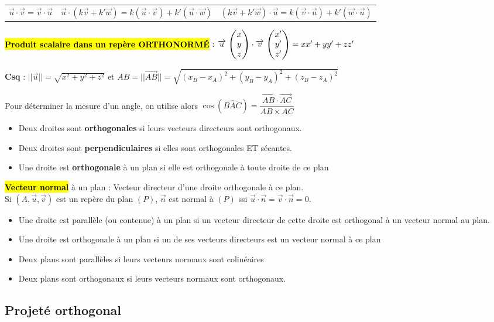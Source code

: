 \documentclass[10pt,fleqn, openany, landscape, twocolumn]{book} %
\begin{document}
\begin{tabularx}{\linewidth}{cXX}
$\vec u \cdot \vec v = \vec v \cdot \vec u$ & $\vec u \cdot ( k \vec v + k' \vec w)= k (\vec u \cdot \vec v) + k' (\vec u \cdot \vec w)$ & $( k \vec v + k' \vec w)\cdot \vec u= k (\vec v \cdot \vec u) + k' (\vec w \cdot \vec u)$\end{tabularx}

\hl{\textbf{Produit scalaire dans un repère ORTHONORMÉ}} :  $\renewcommand{\arraystretch}{1}\coorde{u}{x}{y}{z} \cdot \coorde{v}{x'}{y'}{z'} =xx'+yy'+zz'$

\textbf{Csq} : $||\vec u|| = \sqrt{x^2+y^2+z^2}$ et $AB = ||\overrightarrow{AB}||= \sqrt{(x_B-x_A)^2+(y_B-y_A)^2+(z_B-z_A)^2}$

Pour déterminer la mesure d'un angle, on utilise alors $\cos(\widehat{BAC})=\dfrac{\overrightarrow{AB} \cdot \overrightarrow{AC}}{AB \times AC}$

\begin{itemize}
\item Deux droites sont \textbf{orthogonales} si leurs vecteurs directeurs sont orthogonaux.
\item Deux droites sont \textbf{perpendiculaires} si elles sont orthogonales ET sécantes.
\item Une droite est \textbf{orthogonale} à un plan si elle est orthogonale à toute droite de ce plan
\end{itemize}

\hl{\textbf{Vecteur normal}} à un plan : Vecteur directeur d'une droite orthogonale à ce plan.\\
Si $(A, \vec u, \vec v)$ est un repère du plan $(P)$, $\vec n$ est normal à $(P)$ ssi $\vec u \cdot \vec n = \vec v \cdot \vec n = 0$.

\begin{itemize}
\item Une droite est parallèle (ou contenue) à un plan si un vecteur directeur de cette droite est orthogonal à un vecteur normal au plan.
\item Une droite est orthogonale à un plan si un de ses vecteurs directeurs est un vecteur normal à ce plan
\item Deux plans sont parallèles si leurs vecteurs normaux sont colinéaires
\item Deux plans sont orthogonaux si leurs vecteurs normaux sont orthogonaux.
\end{itemize}

\subsection*{Projeté orthogonal}
\end{document}
